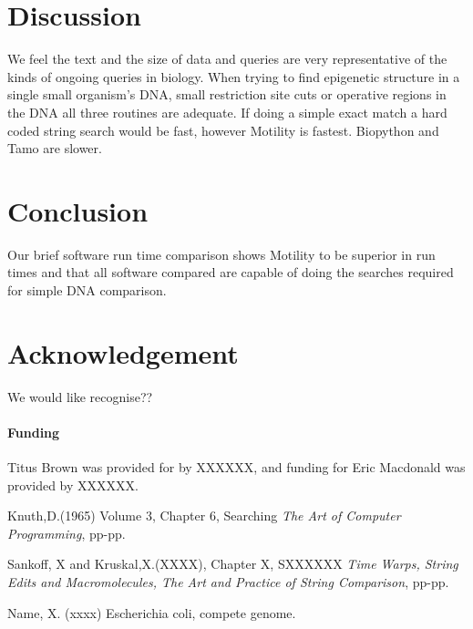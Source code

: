 \documentclass{bioinfo}
\begin{document}
\section{Discussion}
We feel the text and the size of data and queries are very representative 
of the kinds of ongoing queries in biology. When trying to find
epigenetic structure in a single small organism's DNA,
small restriction site cuts or operative regions in the DNA all 
three routines are adequate.
If doing a simple exact match a hard coded string search would be fast,
however Motility is fastest.  
Biopython and Tamo are slower.


\section{Conclusion}
Our brief software run time comparison shows Motility 
to be superior in run times and that all software compared
are capable of doing the searches required for simple DNA comparison.

\section*{Acknowledgement}
We would like recognise??

\paragraph{Funding\textcolon} 
Titus Brown was provided for by XXXXXX, 
and funding for Eric Macdonald was provided by XXXXXX.

%
%
%
%
%
%
%
%
%


\begin{thebibliography}{}

Knuth,D.(1965) Volume 3, Chapter 6, Searching 
\textit {The Art of Computer Programming}, pp-pp.

Sankoff, X and Kruskal,X.(XXXX), Chapter X, SXXXXXX 
\textit {Time Warps, String Edits and Macromolecules, The Art and Practice of
String Comparison}, pp-pp.

 Name, X. (xxxx) Escherichia coli, compete genome. 

\end{thebibliography}
\end{document}
